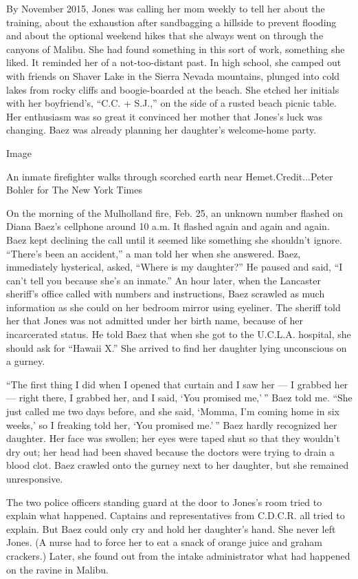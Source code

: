 By November 2015, Jones was calling her mom weekly to tell her about the
training, about the exhaustion after sandbagging a hillside to prevent
flooding and about the optional weekend hikes that she always went on
through the canyons of Malibu. She had found something in this sort of
work, something she liked. It reminded her of a not-too-distant past. In
high school, she camped out with friends on Shaver Lake in the Sierra
Nevada mountains, plunged into cold lakes from rocky cliffs and
boogie-boarded at the beach. She etched her initials with her
boyfriend's, ``C.C. + S.J.,'' on the side of a rusted beach picnic
table. Her enthusiasm was so great it convinced her mother that Jones's
luck was changing. Baez was already planning her daughter's welcome-home
party.

Image

An inmate firefighter walks through scorched earth near
Hemet.Credit...Peter Bohler for The New York Times

On the morning of the Mulholland fire, Feb. 25, an unknown number
flashed on Diana Baez's cellphone around 10 a.m. It flashed again and
again and again. Baez kept declining the call until it seemed like
something she shouldn't ignore. ``There's been an accident,'' a man told
her when she answered. Baez, immediately hysterical, asked, ``Where is
my daughter?'' He paused and said, ``I can't tell you because she's an
inmate.'' An hour later, when the Lancaster sheriff's office called with
numbers and instructions, Baez scrawled as much information as she could
on her bedroom mirror using eyeliner. The sheriff told her that Jones
was not admitted under her birth name, because of her incarcerated
status. He told Baez that when she got to the U.C.L.A. hospital, she
should ask for ``Hawaii X.'' She arrived to find her daughter lying
unconscious on a gurney.

``The first thing I did when I opened that curtain and I saw her --- I
grabbed her --- right there, I grabbed her, and I said, `You promised
me,' '' Baez told me. ``She just called me two days before, and she
said, `Momma, I'm coming home in six weeks,' so I freaking told her,
`You promised me.' '' Baez hardly recognized her daughter. Her face was
swollen; her eyes were taped shut so that they wouldn't dry out; her
head had been shaved because the doctors were trying to drain a blood
clot. Baez crawled onto the gurney next to her daughter, but she
remained unresponsive.

The two police officers standing guard at the door to Jones's room tried
to explain what happened. Captains and representatives from C.D.C.R. all
tried to explain. But Baez could only cry and hold her daughter's hand.
She never left Jones. (A nurse had to force her to eat a snack of orange
juice and graham crackers.) Later, she found out from the intake
administrator what had happened on the ravine in Malibu.

